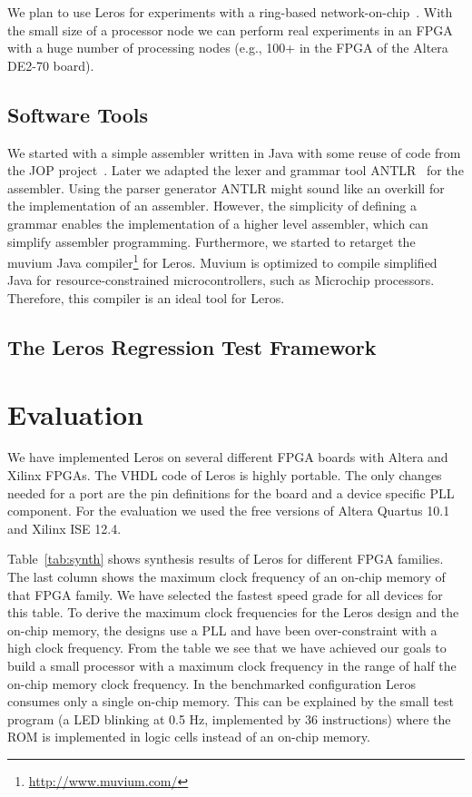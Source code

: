 \documentclass[a4paper,fontsize=10pt,twoside,DIV15,BCOR12mm,headinclude=true,footinclude=false,pagesize,bibtotoc]{scrbook}
\begin{document}
We plan to use Leros for experiments with a ring-based network-on-chip~\cite{jop:csp}. With the small size of a processor node we can perform real experiments in an FPGA with a huge number of processing nodes (e.g., 100+ in the FPGA of the Altera DE2-70 board).

\subsection{Software Tools}

We started with a simple assembler written in Java with some reuse of code from the JOP project~\cite{jop:jnl:jsa2007}. Later we adapted the lexer and grammar tool ANTLR~\cite{antlr:1995} for the assembler. Using the parser generator ANTLR might sound like an overkill for the implementation of an assembler. However, the simplicity of defining a grammar enables the implementation of a  higher level assembler, which can simplify assembler programming. Furthermore, we started to retarget the muvium Java compiler\footnote{\url{http://www.muvium.com/}} for Leros. Muvium is optimized to compile simplified Java for resource-constrained microcontrollers, such as Microchip processors. Therefore, this compiler is an ideal tool for Leros.

\subsection{The Leros Regression Test Framework}

\section{Evaluation}
\label{sec:eval}

We have implemented Leros on several different FPGA boards with Altera and Xilinx FPGAs. The VHDL code of Leros is highly portable. The only changes needed for a port are the pin definitions for the board and a device specific PLL component. For the evaluation we used the free versions of Altera Quartus 10.1 and Xilinx ISE 12.4.


Table~\ref{tab:synth} shows synthesis results of Leros for different FPGA families. The last column shows the maximum clock frequency of an on-chip memory of that FPGA family. We have selected the fastest speed grade for all devices for this table. To derive the maximum clock frequencies for the Leros design and the on-chip memory, the designs use a PLL and have been over-constraint with a high clock frequency.
From the table we see that we have achieved our goals to build a small processor with a maximum clock frequency in the range of half the on-chip memory clock frequency. In the benchmarked configuration Leros consumes only a single on-chip memory. This can be explained by the small test program (a LED blinking at 0.5 Hz, implemented by 36 instructions) where the ROM is implemented in logic cells instead of an on-chip memory.
\end{document}
